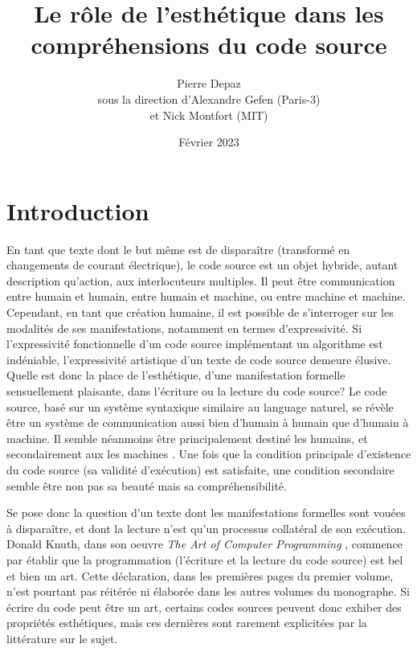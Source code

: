 \documentclass{article}
\begin{document}
\title{Le rôle de l'esthétique dans les compréhensions du code source}
\author{Pierre Depaz\\sous la direction d'Alexandre Gefen (Paris-3)\\et Nick Montfort (MIT)}
\date{Février 2023}
\maketitle

\section{Introduction}

En tant que texte dont le but même est de disparaître (transformé en changements de courant électrique), le code source est un objet hybride, autant description qu'action, aux interlocuteurs multiples. Il peut être communication entre humain et humain, entre humain et machine, ou entre machine et machine. Cependant, en tant que création humaine, il est possible de s'interroger sur les modalités de ses manifestations, notamment en termes d'expressivité. Si l'expressivité fonctionnelle d'un code source implémentant un algorithme est indéniable, l'expressivité artistique d'un texte de code source demeure élusive. Quelle est donc la place de l'esthétique, d'une manifestation formelle sensuellement plaisante, dans l'écriture ou la lecture du code source? Le code source, basé sur un système syntaxique similaire au language naturel, se révèle être un système de communication aussi bien d'humain à humain que d'humain à machine. Il semble néanmoins être principalement destiné les humains, et secondairement aux les machines \citep{abelson_structure_1979}. Une fois que la condition principale d'existence du code source (sa validité d'exécution) est satisfaite, une condition secondaire semble être non pas sa beauté mais sa compréhensibilité.

Se pose donc la question d'un texte dont les manifestations formelles sont vouées à disparaître, et dont la lecture n'est qu'un processus collatéral de son exécution. Donald Knuth, dans son oeuvre \emph{The Art of Computer Programming} \citep{knuth_art_1997}, commence par établir que la programmation (l'écriture et la lecture du code source) est bel et bien un art. Cette déclaration, dans les premières pages du premier volume, n'est pourtant pas réitérée ni élaborée dans les autres volumes du monographe. Si écrire du code peut être un art, certains codes sources peuvent donc exhiber des propriétés esthétiques, mais ces dernières sont rarement explicitées par la littérature sur le sujet.
\end{document}
